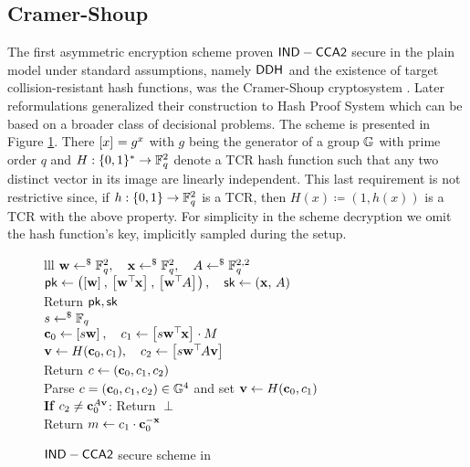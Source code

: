 
\subsection{Cramer-Shoup}

The first asymmetric encryption scheme proven $\mathsf{IND-CCA2}$ secure in the plain model under standard assumptions, namely $\mathsf{DDH}^{}$ and the existence of target collision-resistant hash functions, was the Cramer-Shoup cryptosystem \cite{C:CraSho98}. Later reformulations generalized their construction to Hash Proof System \cite{EC:CraSho02} which can be based on a broader class of decisional problems.
The scheme is presented in Figure \ref{prot:CraSho98}. There $\left[{x}\right]_{} = g^x$ with $g$ being the generator of a group $\mathbb{G}$ with prime order $q$ and $H : \{0,1\}^\ast \to \mathbb{F}_q^2$ denote a TCR  hash function such that any two distinct vector in its image are linearly independent.
This last requirement is not restrictive since, if $h : \{0, 1\} \to \mathbb{F}_q^2$ is a TCR, then $H(x) \coloneqq (1, h(x))$ is a TCR with the above property.
For simplicity in the scheme decryption we omit the hash function's key, implicitly sampled during the setup.

\begin{figure}[htb]
\centering
\begin{pcarray}{lll}
	{
		$\mathbf{w} \gets^{\$} \mathbb{F}_q^2, \quad \mathbf{x} \gets^{\$} \mathbb{F}_q^2, \quad A \gets^{\$} \mathbb{F}_q^{2,2}$
			\\
		$
			\mathsf{pk} \gets \left(
				\left[{\mathbf{w}}\right]_{}
					, \,
				\left[{\mathbf{w}^\top\hspace{-.1em} \mathbf{x}}\right]_{}
					, \,
				\left[{\mathbf{w}^\top\hspace{-.1em} A}\right]_{}
				\right), \quad
			\mathsf{sk} \gets
				(\mathbf{x}, \, A)
		$
			\\
		Return $\mathsf{pk}, \mathsf{sk}$
	}
	\\
	{
		$s \gets^{\$} \mathbb{F}_q$
			\\
		\label{step:CraSho98:enc:first_part}
		$\mathbf{c}_0 \gets \left[{s \mathbf{w}}\right]_{}
			, \quad
		c_1 \gets \left[{s \mathbf{w}^\top\hspace{-.1em} \mathbf{x}}\right]_{} \cdot M$
			\\
		\label{step:CraSho98:enc:second_part}
		$\mathbf{v} \gets H(\mathbf{c}_0, c_1), \quad c_2 \gets \left[{s \mathbf{w}^\top\hspace{-.1em} A \mathbf{v}}\right]_{}$
			\\
		Return $c \gets (\mathbf{c}_0, c_1, c_2)$
	}
	\\
	{
		Parse $c = (\mathbf{c}_0, c_1, c_2) \in \mathbb{G}^4$ and set $\mathbf{v} \gets H(\mathbf{c}_0, c_1)$
			\\
		\label{step:CraSho98:dec:test}
		\textbf{If} $c_2 \neq \mathbf{c}_0^{A \mathbf{v}}$: Return $\perp$
			\\
		\label{step:CraSho98:dec:decrypytion_step}
		Return $m \gets c_1 \cdot \mathbf{c}_0^{-\mathbf{x}}$	
	}
\end{pcarray}
\caption{$\mathsf{IND-CCA2}$ secure scheme in \cite{C:CraSho98}}
\label{prot:CraSho98}
\end{figure}

